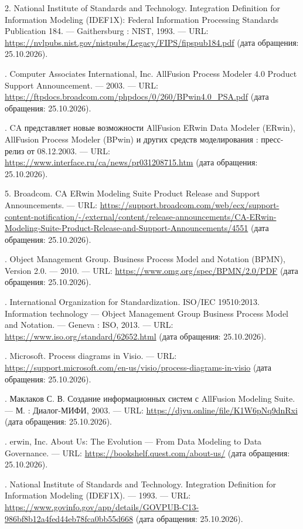 \documentclass[essaypaper,paper]{pmk-graduate}
\begin{document}
2. National Institute of Standards and Technology. Integration Definition for Information Modeling (IDEF1X): Federal Information Processing Standards Publication 184. — Gaithersburg : NIST, 1993. — URL: \url{https://nvlpubs.nist.gov/nistpubs/Legacy/FIPS/fipspub184.pdf} (дата обращения: 25.10.2026).

\par

. Computer Associates International, Inc. AllFusion Process Modeler 4.0 Product Support Announcement. — 2003. — URL: \url{https://ftpdocs.broadcom.com/phpdocs/0/260/BPwin4.0\_PSA.pdf} (дата обращения: 25.10.2026).\par

. CA представляет новые возможности AllFusion ERwin Data Modeler (ERwin), AllFusion Process Modeler (BPwin) и других средств моделирования : пресс-релиз от 08.12.2003. — URL: \url{https://www.interface.ru/ca/news/pr031208715.htm} (дата обращения: 25.10.2026).\par

5. Broadcom. CA ERwin Modeling Suite Product Release and Support Announcements. — URL: \url{https://support.broadcom.com/web/ecx/support-content-notification/-/external/content/release-announcements/CA-ERwin-Modeling-Suite-Product-Release-and-Support-Announcements/4551} (дата обращения: 25.10.2026).

\par

. Object Management Group. Business Process Model and Notation (BPMN), Version 2.0. — 2010. — URL: \url{https://www.omg.org/spec/BPMN/2.0/PDF} (дата обращения: 25.10.2026).\par

. International Organization for Standardization. ISO/IEC 19510:2013. Information technology — Object Management Group Business Process Model and Notation. — Geneva : ISO, 2013. — URL: \url{https://www.iso.org/standard/62652.html} (дата обращения: 25.10.2026).\par

. Microsoft. Process diagrams in Visio. — URL: \url{https://support.microsoft.com/en-us/visio/process-diagrams-in-visio} (дата обращения: 25.10.2026).\par

. Маклаков С. В. Создание информационных систем с AllFusion Modeling Suite. — М. : Диалог-МИФИ, 2003. — URL: \url{https://djvu.online/file/K1W6pNq9dnRxi} (дата обращения: 25.10.2026).\par

. erwin, Inc. About Us: The Evolution — From Data Modeling to Data Governance. — URL: \url{https://bookshelf.quest.com/about-us/} (дата обращения: 25.10.2026).\par

. National Institute of Standards and Technology. Integration Definition for Information Modeling (IDEF1X). — 1993. — URL: \url{https://www.govinfo.gov/app/details/GOVPUB-C13-986bf8b12a4fed44eb78fca0bb55d668} (дата обращения: 25.10.2026).\par
\end{document}
